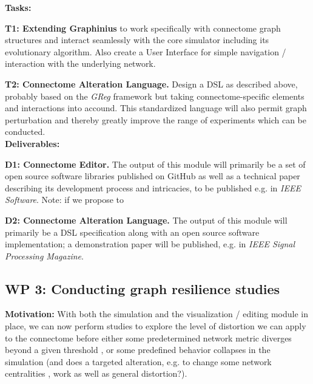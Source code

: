 \documentclass[a4paper,11pt]{article}
\begin{document}


\textbf{Tasks:}

\textbf{T1: Extending Graphinius} to work specifically with connectome graph structures and interact seamlessly with the core simulator including its evolutionary algorithm. Also create a User Interface for simple navigation / interaction with the underlying network.

\textbf{T2: Connectome Alteration Language.} Design a DSL as described above, probably based on the \emph{GReg} framework but taking connectome-specific elements and interactions into accound. This standardized language will also permit graph perturbation and thereby greatly improve the range of experiments which can be conducted.
\\[0,2cm]


\textbf{Deliverables:}

\textbf{D1: Connectome Editor.} The output of this module will primarily be a set of open source software libraries published on GitHub as well as a technical paper describing its development process and intricacies, to be published e.g. in \textit{IEEE Software}.
Note: if we propose to 

\textbf{D2: Connectome Alteration Language.} The output of this module will primarily be a DSL specification along with an open source software implementation; a demonstration paper will be published, e.g. in \textit{IEEE Signal Processing Magazine}.



\subsection{WP 3: Conducting graph resilience studies}

\textbf{Motivation:}
With both the simulation and the visualization / editing module in place, we can now perform studies to explore the level of distortion we can apply to the connectome before either some predetermined network metric diverges beyond a given threshold \citep{KoutraFaloutsos:2016:GraphSimilarity}, or some predefined behavior collapses in the simulation (and does a targeted alteration, e.g. to change some network centralities \citep{Crescenzi2016}, work as well as general distortion?). 
\end{document}
